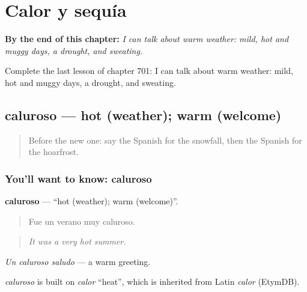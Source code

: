 
\chapter{Calor y sequía}
\label{ch:es-calor-y-sequia}

\begin{chapteropening}
\textbf{By the end of this chapter:} \emph{I can talk about warm weather: mild, hot and muggy days, a drought, and sweating.}

Complete the last lesson of chapter 701: I can talk about warm weather: mild, hot and muggy days, a drought, and sweating.
\end{chapteropening}

\section[caluroso]{caluroso — hot (weather); warm (welcome)}

\label{lesson:ES-C701-caluroso}



\begin{quote}
Before the new one: say the Spanish for the snowfall, then the Spanish for the hoarfrost.
\end{quote}

\subsection*{You'll want to know: caluroso}
\textbf{caluroso} — \textquotedblleft{}hot (weather); warm (welcome)\textquotedblright{}.

\begin{quote}
Fue un verano muy caluroso.
\end{quote}

\begin{quote}
\emph{It was a very hot summer.}
\end{quote}

\emph{Un caluroso saludo} — a warm greeting.

\begin{cousinweb}
\emph{caluroso} is built on \emph{calor} \textquotedblleft{}heat\textquotedblright{}, which is inherited from Latin \emph{calor} (EtymDB).
\end{cousinweb}

